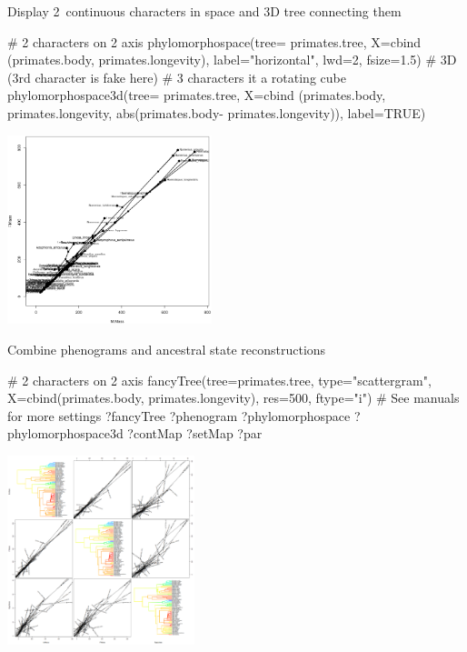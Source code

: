 \documentclass[compress, ucs, xelatex, 11pt, xcolor=svgnames, aspectratio=169,
	hyperref={
		bookmarks=true,
		unicode=true,
		colorlinks=true,
		pdftitle={Molecular data in R},
		plainpages=false,
		pdfauthor={Vojtech Zeisek},
		pdfsubject={Course about phylogeny and evolution in R},
		pdfcreator={XeLaTeX},
		pdfkeywords={R, evolution, phylogeny, molecular data},
		linkcolor=Crimson, %
		anchorcolor=Magenta, %
		citecolor=Magenta, %
		filecolor=Magenta, %
		menucolor=Magenta, %
		urlcolor=DodgerBlue, %
		pdftex},
	url={hyphens, lowtilde} %
	]{beamer}
\begin{document}
\begin{frame}[fragile]{Display 2~continuous characters in space and 3D tree connecting them}
	\begin{multicols}{2}
		\begin{spluscode}
    # 2 characters on 2 axis
    phylomorphospace(tree=
      primates.tree, X=cbind
      (primates.body,
      primates.longevity),
      label="horizontal",
      lwd=2, fsize=1.5)
    # 3D (3rd character is fake here)
    # 3 characters it a rotating cube
    phylomorphospace3d(tree=
      primates.tree, X=cbind
      (primates.body,
      primates.longevity,
      abs(primates.body-
      primates.longevity)),
      label=TRUE)
		\end{spluscode}
		\begin{center}
			\includegraphics[height=5.5cm]{phylomorphospace.png}
		\end{center}
	\end{multicols}
\end{frame}

\begin{frame}[fragile]{Combine phenograms and ancestral state reconstructions}
	\begin{multicols}{2}
		\begin{spluscode}
    # 2 characters on 2 axis
    fancyTree(tree=primates.tree,
      type="scattergram",
      X=cbind(primates.body,
      primates.longevity),
      res=500, ftype="i")
    # See manuals for more settings
    ?fancyTree
    ?phenogram
    ?phylomorphospace
    ?phylomorphospace3d
    ?contMap
    ?setMap
    ?par
		\end{spluscode}
		\begin{center}
			\includegraphics[height=5.5cm]{phenogram-ace.png}
		\end{center}
	\end{multicols}
\end{frame}
\end{document}

